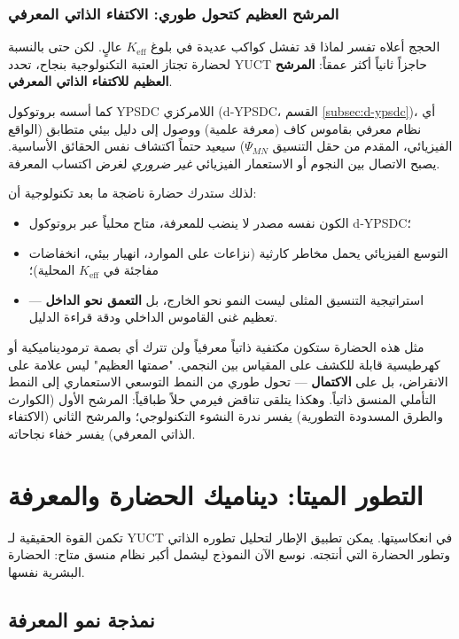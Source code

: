 \documentclass[11pt,a4paper]{article}
\begin{document}
	\subsubsection*{المرشح العظيم كتحول طوري: الاكتفاء الذاتي المعرفي}
	
	الحجج أعلاه تفسر لماذا قد تفشل كواكب عديدة في بلوغ \(K_{\mathrm{eff}}\) عالٍ. لكن حتى بالنسبة لحضارة تجتاز العتبة التكنولوجية بنجاح، تحدد YUCT حاجزاً ثانياً أكثر عمقاً: \textbf{المرشح العظيم للاكتفاء الذاتي المعرفي}.
	
	كما أسسه بروتوكول YPSDC اللامركزي (d‑YPSDC، القسم \ref{subsec:d-ypsdc})، أي نظام معرفي بقاموس كاف (معرفة علمية) ووصول إلى دليل بيئي متطابق (الواقع الفيزيائي، المقدم من حقل التنسيق \(\Psi_{MN}\)) سيعيد حتماً اكتشاف نفس الحقائق الأساسية. يصبح الاتصال بين النجوم أو الاستعمار الفيزيائي \emph{غير ضروري} لغرض اكتساب المعرفة.
	
	لذلك ستدرك حضارة ناضجة ما بعد تكنولوجية أن:
	\begin{itemize}[leftmargin=*]
		\item الكون نفسه مصدر لا ينضب للمعرفة، متاح محلياً عبر بروتوكول d‑YPSDC؛
		\item التوسع الفيزيائي يحمل مخاطر كارثية (نزاعات على الموارد، انهيار بيئي، انخفاضات مفاجئة في \(K_{\mathrm{eff}}\) المحلية)؛
		\item استراتيجية التنسيق المثلى ليست النمو نحو الخارج، بل \textbf{التعمق نحو الداخل} — تعظيم غنى القاموس الداخلي ودقة قراءة الدليل.
	\end{itemize}
	
	مثل هذه الحضارة ستكون مكتفية ذاتياً معرفياً ولن تترك أي بصمة ترموديناميكية أو كهرطيسية قابلة للكشف على المقياس بين النجمي. "صمتها العظيم" ليس علامة على الانقراض، بل على \textbf{الاكتمال} — تحول طوري من النمط التوسعي الاستعماري إلى النمط التأملي المنسق ذاتياً. وهكذا يتلقى تناقض فيرمي حلاً طباقياً: المرشح الأول (الكوارث والطرق المسدودة التطورية) يفسر ندرة النشوء التكنولوجي؛ والمرشح الثاني (الاكتفاء الذاتي المعرفي) يفسر خفاء نجاحاته.
	
	\section{التطور الميتا: ديناميك الحضارة والمعرفة}
	\label{sec:meta-evolution}
	
	تكمن القوة الحقيقية لـ YUCT في انعكاسيتها. يمكن تطبيق الإطار لتحليل تطوره الذاتي وتطور الحضارة التي أنتجته. نوسع الآن النموذج ليشمل أكبر نظام منسق متاح: الحضارة البشرية نفسها.
	
	\subsection{نمذجة نمو المعرفة}
	
\end{document}
